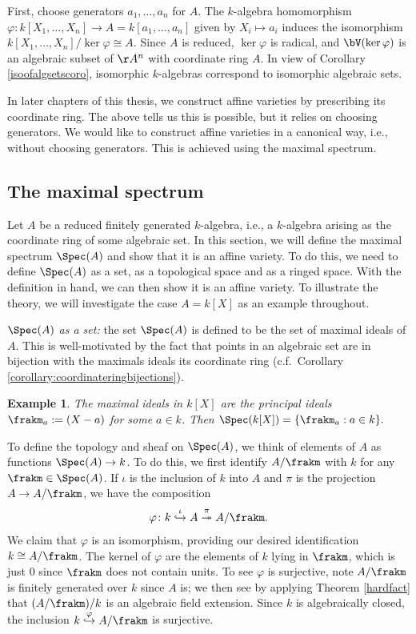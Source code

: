 \documentclass[12pt]{amsart}
\theoremstyle{plain}
\newtheorem{example}[theorem]{Example}
\begin{document}
First, choose generators $a_1, \ldots, a_n$ for $A$.
The $k$-algebra homomorphism $\varphi : k[X_1, \ldots, X_n] \to A=k[a_1,\ldots,a_n]$ given by $X_i \mapsto a_i$ induces the isomorphism $k[X_1, \ldots, X_n] / \ker \varphi \cong A$.
Since $A$ is reduced, $\ker\varphi$ is radical, and $\bV(\ker \varphi)$ is an algebraic subset of $\AA^n$ with coordinate ring $A$.
In view of Corollary \ref{isoofalgsetscoro}, isomorphic $k$-algebras correspond to isomorphic algebraic sets.

In later chapters of this thesis, we construct affine varieties by prescribing its coordinate ring.
The above tells us this is possible, but it relies on choosing generators.
We would like to construct affine varieties in a canonical way, i.e., without choosing generators.
This is achieved using the maximal spectrum.





\subsection{The maximal spectrum}\label{section:themaximalspectrum}
Let $A$ be a reduced finitely generated $k$-algebra, i.e., a $k$-algebra arising as the coordinate ring of some algebraic set.
In this section, we will define the maximal spectrum $\Spec(A)$ and show that it is an affine variety.
To do this, we need to define $\Spec(A)$ as a set, as a topological space and as a ringed space.
With the definition in hand, we can then show it is an affine variety.
To illustrate the theory, we will investigate the case $A=k[X]$ as an example throughout.

\emph{$\Spec(A)$ as a set:}
the set $\Spec(A)$ is defined to be the set of maximal ideals of $A$.
This is well-motivated by the fact that points in an algebraic set are in bijection with the maximals ideals its coordinate ring (c.f.\ Corollary \ref{corollary:coordinateringbijections}).

\begin{example}
The maximal ideals in $k[X]$ are the principal ideals $\frakm_a:=(X-a)$ for some $a\in k$.
Then $\Spec(k[X]) = \{\frakm_a : a \in k\}.$
\end{example}

To define the topology and sheaf on $\Spec(A)$, we think of elements of $A$ as functions $\Spec(A) \to k$.
To do this, we first identify $A/\frakm$ with $k$ for any $\frakm \in \Spec(A)$.
If $\iota$ is the inclusion of $k$ into $A$ and $\pi$ is the projection $A \to A/\frakm$, we have the composition
$$\varphi \colon k \overset{\iota}{\hookrightarrow} A \overset{\pi}{\twoheadrightarrow} A/\frakm.$$
We claim that $\varphi$ is an isomorphism, providing our desired identification $k \cong A/\frakm$.
The kernel of $\varphi$ are the elements of $k$ lying in $\frakm$, which is just $0$ since $\frakm$ does not contain units.
To see $\varphi$ is surjective, note $A/\frakm$ is finitely generated over $k$ since $A$ is;
we then see by applying Theorem \ref{hardfact} that $(A/\frakm)/k$ is an algebraic field extension.
Since $k$ is algebraically closed, the inclusion $k \overset{\varphi}{\hookrightarrow} A/\frakm$ is surjective.
\end{document}
